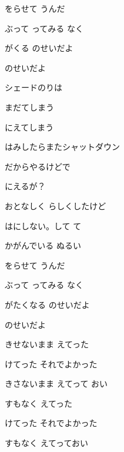 \documentclass[a4paper,tate,twocolumn,12pt]{ltjtarticle}
\begin{document}
\begin{flushleft}
\begin{minipage}{\linewidth}
をらせて うんだ 

ぶって ってみる なく

がくる のせいだよ

のせいだよ
\end{minipage}

\vspace{2em}

\noindent\begin{minipage}{\linewidth}
シェードのりは

まだてしまう

にえてしまう 

はみしたらまたシャットダウン

だからやるけどで

にえるが？

おとなしく らしくしたけど

はにしない。して て
\end{minipage}

\vspace{2em}

\noindent\begin{minipage}{\linewidth}
かがんでいる ぬるい

をらせて うんだ 

ぶって ってみる なく

がたくなる のせいだよ

のせいだよ
\end{minipage}

\vspace{2em}

\noindent\begin{minipage}{\linewidth}
きせないまま えてった

けてった それでよかった

きさないまま えてって おい

すもなく えてった

けてった それでよかった

すもなく えてっておい
\end{minipage}

\end{flushleft}
\end{document}
